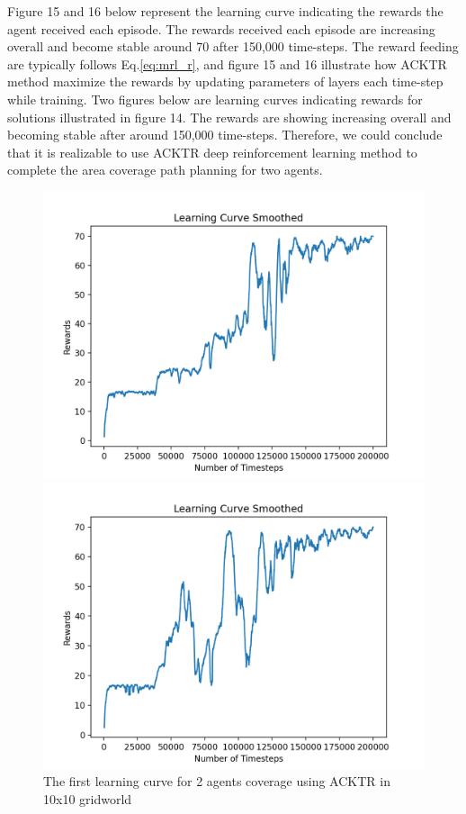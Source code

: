 \documentclass{article}
\begin{document}
Figure 15 and 16 below represent the learning curve indicating the rewards the agent received each episode. The rewards received each episode are increasing overall and become stable around 70 after 150,000 time-steps. The reward feeding are typically follows Eq.\ref{eq:mrl_r}, and figure 15 and 16 illustrate how ACKTR method maximize the rewards by updating parameters of layers each time-step while training. Two figures below are learning curves indicating rewards for solutions illustrated in figure 14. The rewards are showing increasing overall and becoming stable after around 150,000 time-steps. Therefore, we could conclude that it is realizable to use ACKTR deep reinforcement learning method to complete the area coverage path planning for two agents.

\begin{figure}[H]
   \begin{minipage}{0.49\textwidth}
     \centering
     \includegraphics[width=\linewidth]{13.png}
     \caption{The first learning curve for 2 agents coverage using ACKTR in 10x10 gridworld}\label{Fig:Data1}
   \end{minipage}\hfill
   \begin{minipage}{0.49\textwidth}
     \centering
     \includegraphics[width=\linewidth]{14.png}

\end{minipage}
\end{figure}
\end{document}
